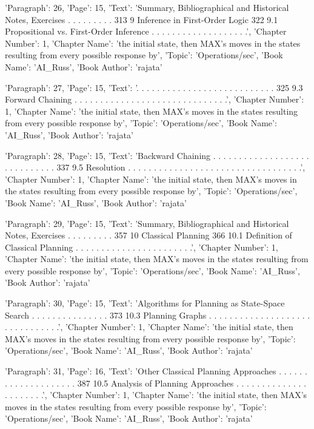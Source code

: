 {'Paragraph': 26, 'Page': 15, 'Text': 'Summary, Bibliographical and Historical Notes, Exercises . . . . . . . . . 313 9 Inference in First-Order Logic 322 9.1 Propositional vs. First-Order Inference . . . . . . . . . . . . . . . . . . .', 'Chapter Number': 1, 'Chapter Name': 'the initial state, then MAX’s moves in the states resulting from every possible response by', 'Topic': 'Operations/sec', 'Book Name': 'AI_Russ', 'Book Author': 'rajata'}

{'Paragraph': 27, 'Page': 15, 'Text': '. . . . . . . . . . . . . . . . . . . . . . . . . . . 325 9.3 Forward Chaining . . . . . . . . . . . . . . . . . . . . . . . . . . . . . .', 'Chapter Number': 1, 'Chapter Name': 'the initial state, then MAX’s moves in the states resulting from every possible response by', 'Topic': 'Operations/sec', 'Book Name': 'AI_Russ', 'Book Author': 'rajata'}

{'Paragraph': 28, 'Page': 15, 'Text': 'Backward Chaining . . . . . . . . . . . . . . . . . . . . . . . . . . . . . 337 9.5 Resolution . . . . . . . . . . . . . . . . . . . . . . . . . . . . . . . . . .', 'Chapter Number': 1, 'Chapter Name': 'the initial state, then MAX’s moves in the states resulting from every possible response by', 'Topic': 'Operations/sec', 'Book Name': 'AI_Russ', 'Book Author': 'rajata'}

{'Paragraph': 29, 'Page': 15, 'Text': 'Summary, Bibliographical and Historical Notes, Exercises . . . . . . . . . 357 10 Classical Planning 366 10.1 Deﬁnition of Classical Planning . . . . . . . . . . . . . . . . . . . . . . .', 'Chapter Number': 1, 'Chapter Name': 'the initial state, then MAX’s moves in the states resulting from every possible response by', 'Topic': 'Operations/sec', 'Book Name': 'AI_Russ', 'Book Author': 'rajata'}

{'Paragraph': 30, 'Page': 15, 'Text': 'Algorithms for Planning as State-Space Search . . . . . . . . . . . . . . . 373 10.3 Planning Graphs . . . . . . . . . . . . . . . . . . . . . . . . . . . . . . .', 'Chapter Number': 1, 'Chapter Name': 'the initial state, then MAX’s moves in the states resulting from every possible response by', 'Topic': 'Operations/sec', 'Book Name': 'AI_Russ', 'Book Author': 'rajata'}

{'Paragraph': 31, 'Page': 16, 'Text': 'Other Classical Planning Approaches . . . . . . . . . . . . . . . . . . . . 387 10.5 Analysis of Planning Approaches . . . . . . . . . . . . . . . . . . . . . .', 'Chapter Number': 1, 'Chapter Name': 'the initial state, then MAX’s moves in the states resulting from every possible response by', 'Topic': 'Operations/sec', 'Book Name': 'AI_Russ', 'Book Author': 'rajata'}

